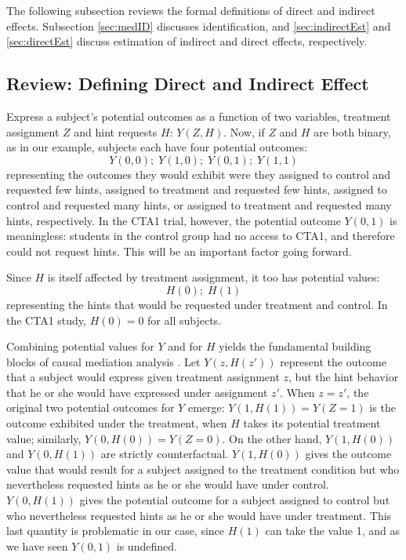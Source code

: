 \documentclass{article}\usepackage[]{graphicx}\usepackage[]{color}
\begin{document}
The following subsection reviews the formal definitions of direct and indirect effects.
Subsection \ref{sec:medID} discusses identification, and
\ref{sec:indirectEst} and \ref{sec:directEst} discuss estimation of
indirect and direct effects, respectively.

\subsection{Review: Defining Direct and Indirect Effect}
Express a subject's potential outcomes as a function
of two variables, treatment assignment $Z$ and hint requests $H$:
$Y(Z,H)$.
Now, if $Z$ and $H$ are both binary, as in our example, subjects
each have four potential outcomes:
\begin{equation*}
Y(0,0);\;Y(1,0);\;Y(0,1);\;Y(1,1)
\end{equation*}
representing the outcomes they would exhibit were they assigned to
control and requested few hints, assigned to
treatment and requested few hints, assigned to control and requested
many hints, or assigned to treatment and requested many hints, respectively.
In the CTA1 trial, however, the potential outcome $Y(0,1)$ is
meaningless: students in the control group had no access to CTA1, and
therefore could not request hints.
This will be an important factor going forward.

Since $H$ is itself affected by treatment assignment, it
too has potential values:
\begin{equation*}
H(0);\;H(1)
\end{equation*}
representing the hints that would be requested under treatment and
control.
In the CTA1 study, $H(0)=0$ for all subjects.

Combining potential values for $Y$ and for $H$ yields the fundamental
building blocks of causal mediation analysis
\citep[e.g.][]{vanderweele2015explanation}.
Let $Y(z,H(z'))$
represent the outcome that a subject would express given treatment
assignment $z$, but the hint behavior that he or she would have
expressed under assignment $z'$.
When $z=z'$, the original two potential outcomes for $Y$ emerge:
$Y(1,H(1))=Y(Z=1)$ is the outcome exhibited under the treatment, when $H$
takes its potential treatment value; similarly, $Y(0,H(0))=Y(Z=0)$. On
the other hand, $Y(1,H(0))$ and $Y(0,H(1))$ are strictly
counterfactual. $Y(1,H(0))$ gives the outcome value
that would result for a subject assigned to the treatment condition
but who nevertheless requested hints as he or she would have under
control. $Y(0,H(1))$ gives the potential outcome for a subject
assigned to control but who nevertheless requested hints as he or she
would have under treatment.
This last quantity is problematic in our case, since $H(1)$ can take the value 1,
and as we have seen $Y(0,1)$ is undefined.
\end{document}
